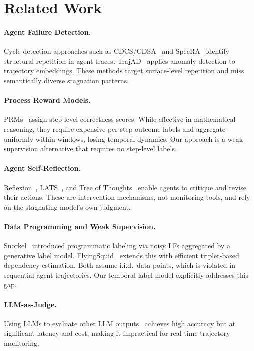 \documentclass[11pt]{article}
\begin{document}
\section{Related Work}
\label{sec:related}

\paragraph{Agent Failure Detection.}
Cycle detection approaches such as CDCS/CDSA~\citep{chen2024cdcs} and SpecRA~\citep{wang2024specra} identify structural repetition in agent traces.
TrajAD~\citep{zhang2024trajad} applies anomaly detection to trajectory embeddings.
These methods target surface-level repetition and miss semantically diverse stagnation patterns.

\paragraph{Process Reward Models.}
PRMs~\citep{lightman2023lets,wang2024mathshepherd} assign step-level correctness scores.
While effective in mathematical reasoning, they require expensive per-step outcome labels and aggregate uniformly within windows, losing temporal dynamics.
Our approach is a weak-supervision alternative that requires no step-level labels.

\paragraph{Agent Self-Reflection.}
Reflexion~\citep{shinn2023reflexion}, LATS~\citep{zhou2023lats}, and Tree of Thoughts~\citep{yao2023tree} enable agents to critique and revise their actions.
These are intervention mechanisms, not monitoring tools, and rely on the stagnating model's own judgment.

\paragraph{Data Programming and Weak Supervision.}
Snorkel~\citep{ratner2017snorkel} introduced programmatic labeling via noisy LFs aggregated by a generative label model.
FlyingSquid~\citep{fu2020fast} extends this with efficient triplet-based dependency estimation.
Both assume i.i.d.\ data points, which is violated in sequential agent trajectories.
Our temporal label model explicitly addresses this gap.

\paragraph{LLM-as-Judge.}
Using LLMs to evaluate other LLM outputs~\citep{zheng2023judging} achieves high accuracy but at significant latency and cost, making it impractical for real-time trajectory monitoring.
\end{document}
